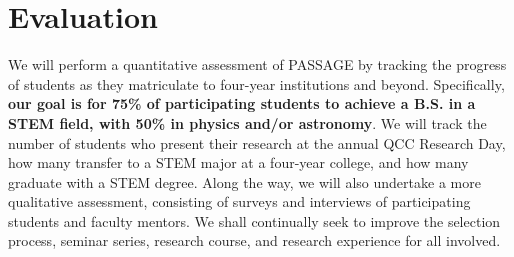 \documentclass[12pt]{article}
\begin{document}





\section{Evaluation}



We will perform a quantitative assessment of PASSAGE by tracking the progress of students as they matriculate to four-year institutions and beyond. Specifically, {\bf our goal is for 75\% of participating students to achieve a B.S. in a STEM field, with 50\% in physics and/or astronomy}. We will track the number of students who present their research at the annual QCC Research Day, how many transfer to a STEM major at a four-year college, and how many graduate with a STEM degree.  Along the way, we will also undertake a more qualitative assessment, consisting of surveys and interviews of participating students and faculty mentors.  We shall continually seek to improve the selection process, seminar series, research course, and research experience for all involved.
\end{document}
